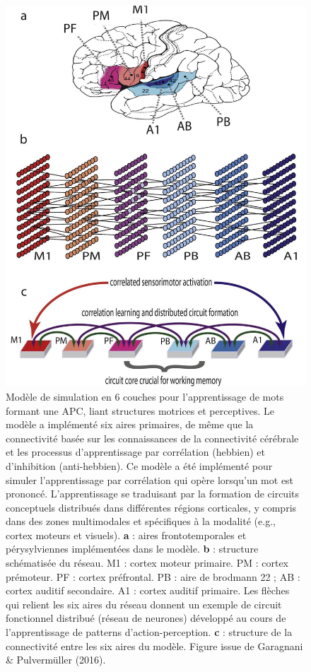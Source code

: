 \documentclass[
  a4paper,12pt,twoside,onecolumn,openright,final,oldfontcommands]{memoir}
\begin{document}
\begin{figure}[htbp!]

{\centering \includegraphics[width=0.8\linewidth]{figures/chap2-fig1} 

}

\caption{Modèle de simulation en 6 couches pour l’apprentissage de mots formant une APC, liant structures motrices et perceptives. Le modèle a implémenté six aires primaires, de même que la connectivité basée sur les connaissances de la connectivité cérébrale et les processus d’apprentissage par corrélation (hebbien) et d’inhibition (anti-hebbien). Ce modèle a été implémenté pour simuler l’apprentissage par corrélation qui opère lorsqu’un mot est prononcé. L’apprentissage se traduisant par la formation de circuits conceptuels distribués dans différentes régions corticales, y compris dans des zones multimodales et spécifiques à la modalité (e.g., cortex moteurs et visuels). \textbf{a} : aires frontotemporales et pérysylviennes implémentées dans le modèle. \textbf{b} : structure schématisée du réseau. M1 : cortex moteur primaire. PM : cortex prémoteur. PF : cortex préfrontal. PB : aire de brodmann 22 ; AB : cortex auditif secondaire. A1 : cortex auditif primaire. Les flèches qui relient les six aires du réseau donnent un exemple de circuit fonctionnel distribué (réseau de neurones) développé au cours de l'apprentissage de patterns d’action-perception. \textbf{c} : structure de la connectivité entre les six aires du modèle. Figure issue de Garagnani \& Pulvermüller (2016).}\label{fig:chap2-fig1}
\end{figure}
\end{document}
